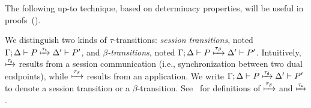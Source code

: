 \documentclass[runningheads]{llncs}
\begin{document}
{{%
%


The following up-to technique, based on determinacy properties, will be useful in proofs~().

 
 \begin{notation}
 \label{not:dettrans}
We distinguish two kinds of  $\tau$-transitions:
\emph{session transitions}, noted 
$\Gamma; \Delta \vdash P \xmapsto{\tau_{\mathsf{s}}} \Delta' \vdash P'$,
and 
\emph{$\beta$-transitions}, noted $\Gamma; \Delta \vdash P \xmapsto{\tau_{\beta}} \Delta' \vdash P'$.
Intuitively, $\xmapsto{\tau_{\mathsf{s}}}$  results from a session communication (i.e., synchronization between
two dual endpoints), while 
  $\xmapsto{\tau_{\beta}}$ results from an application. 
 We write  $\Gamma; \Delta \vdash P \xmapsto{\tau_{\mathsf{d}}} \Delta' \vdash P'$ to denote
	 a session transition or a $\beta$-transition.
	See~\cite{KouzapasPY17} for definitions of $\xmapsto{\tau_{\beta}}$  and $\xmapsto{\tau_{\mathsf{s}}}$. %
 \end{notation}
 
}}
\end{document}
